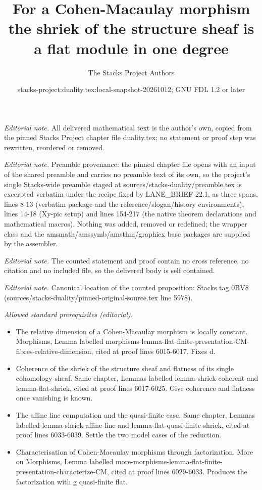\documentclass[10pt,a4paper]{amsart}
\title{For a Cohen-Macaulay morphism the shriek of the structure sheaf is a flat module in one degree}
\author{The Stacks Project Authors}
\date{stacks-project:duality.tex:local-snapshot-20261012; GNU FDL 1.2 or later}
\theoremstyle{plain}
\theoremstyle{definition}
\theoremstyle{remark}
\numberwithin{equation}{subsection}
\begin{document}
\maketitle
\noindent\textit{Editorial note.} All delivered mathematical text is the author's own, copied from the pinned Stacks Project chapter file duality.tex; no statement or proof step was rewritten, reordered or removed.\par\medskip
\noindent\textit{Editorial note.} Preamble provenance: the pinned chapter file opens with an input of the shared preamble and carries no preamble text of its own, so the project's single Stacks-wide preamble staged at sources/stacks-duality/preamble.tex is excerpted verbatim under the recipe fixed by LANE\_BRIEF 22.1, as three spans, lines 8-13 (verbatim package and the reference/slogan/history environments), lines 14-18 (Xy-pic setup) and lines 154-217 (the native theorem declarations and mathematical macros). Nothing was added, removed or redefined; the wrapper class and the amsmath/amssymb/amsthm/graphicx base packages are supplied by the assembler.\par\medskip
\noindent\textit{Editorial note.} The counted statement and proof contain no cross reference, no citation and no included file, so the delivered body is self contained.\par\medskip
\noindent\textit{Editorial note.} Canonical location of the counted proposition: Stacks tag 0BV8 (sources/stacks-duality/pinned-original-source.tex line 5978).\par\medskip
\noindent\textit{Allowed standard prerequisites (editorial).}\begin{itemize}
\item The relative dimension of a Cohen-Macaulay morphism is locally constant. Morphisms, Lemma labelled morphisms-lemma-flat-finite-presentation-CM-fibres-relative-dimension, cited at proof lines 6015-6017. Fixes d.
\item Coherence of the shriek of the structure sheaf and flatness of its single cohomology sheaf. Same chapter, Lemmas labelled lemma-shriek-coherent and lemma-flat-shriek, cited at proof lines 6017-6025. Give coherence and flatness once vanishing is known.
\item The affine line computation and the quasi-finite case. Same chapter, Lemmas labelled lemma-shriek-affine-line and lemma-flat-quasi-finite-shriek, cited at proof lines 6033-6039. Settle the two model cases of the reduction.
\item Characterisation of Cohen-Macaulay morphisms through factorization. More on Morphisms, Lemma labelled more-morphisms-lemma-flat-finite-presentation-characterize-CM, cited at proof lines 6029-6033. Produces the factorization with g quasi-finite flat.
\end{itemize}\medskip
\end{document}
